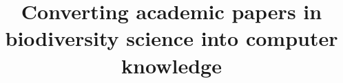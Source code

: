 \documentclass{bmcart}
\begin{document}
\begin{frontmatter}

\begin{fmbox}


\title{Converting academic papers in biodiversity science into computer knowledge}


\author[
   addressref={aff1, aff2},                   %
   corref={aff1},                       %
   email={datascience@pensoft.net}   %
]{ }

\author[
   addressref={aff3},                   %
   email={kivs@bultreebank.org}   %
]{ }

\author[
   addressref={aff1, aff2},                   %
   email={penev@pensoft.net}   %
]{ }



\end{fmbox}
\end{frontmatter}
\end{document}
